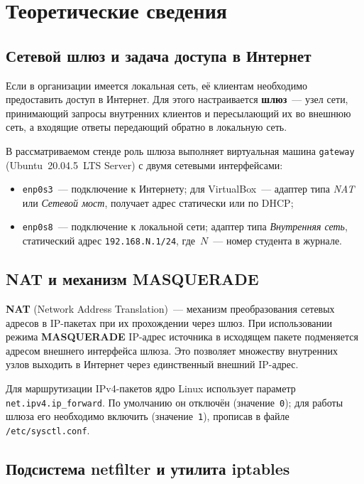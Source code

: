 \chapter{Теоретические сведения}
\label{ch:theory}

\section{Сетевой шлюз и задача доступа в Интернет}
\label{sec:gateway}

Если в организации имеется локальная сеть, её клиентам необходимо предоставить доступ
в Интернет. Для этого настраивается \textbf{шлюз}~— узел сети, принимающий запросы
внутренних клиентов и пересылающий их во внешнюю сеть, а входящие ответы
передающий обратно в локальную сеть.

В рассматриваемом стенде роль шлюза выполняет виртуальная машина \texttt{gateway}
(Ubuntu~20.04.5~LTS Server) с двумя сетевыми интерфейсами:
\begin{itemize}
  \item \texttt{enp0s3}~— подключение к Интернету; для VirtualBox~— адаптер типа
    \textit{NAT} или \textit{Сетевой мост}, получает адрес статически или по DHCP;
  \item \texttt{enp0s8}~— подключение к локальной сети; адаптер типа
    \textit{Внутренняя сеть}, статический адрес \texttt{192.168.N.1/24},
    где~$N$~— номер студента в журнале.
\end{itemize}

\section{NAT и механизм MASQUERADE}
\label{sec:nat}

\textbf{NAT} (Network Address Translation)~— механизм преобразования сетевых адресов
в IP-пакетах при их прохождении через шлюз. При использовании
режима \textbf{MASQUERADE} IP-адрес источника в исходящем пакете подменяется
адресом внешнего интерфейса шлюза. Это позволяет множеству внутренних узлов
выходить в Интернет через единственный внешний IP-адрес.

Для маршрутизации IPv4-пакетов ядро Linux использует параметр
\texttt{net.ipv4.ip\_forward}. По умолчанию он отключён (значение~\texttt{0});
для работы шлюза его необходимо включить (значение~\texttt{1}),
прописав в файле \texttt{/etc/sysctl.conf}.

\section{Подсистема netfilter и утилита iptables}
\label{sec:iptables}

